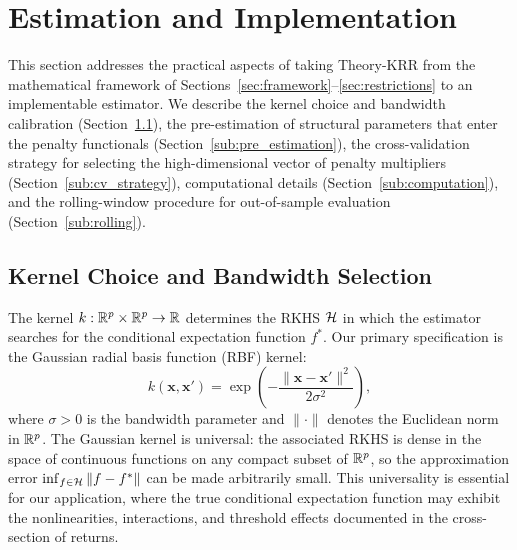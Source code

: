 
\section{Estimation and Implementation}\label{sec:estimation}

This section addresses the practical aspects of taking Theory-KRR from the mathematical framework of Sections~\ref{sec:framework}--\ref{sec:restrictions} to an implementable estimator.
We describe the kernel choice and bandwidth calibration (Section~\ref{sub:kernel_choice}), the pre-estimation of structural parameters that enter the penalty functionals (Section~\ref{sub:pre_estimation}), the cross-validation strategy for selecting the high-dimensional vector of penalty multipliers (Section~\ref{sub:cv_strategy}), computational details (Section~\ref{sub:computation}), and the rolling-window procedure for out-of-sample evaluation (Section~\ref{sub:rolling}).

\subsection{Kernel Choice and Bandwidth Selection}\label{sub:kernel_choice}

The kernel $k: \mathbb{R}^p \times \mathbb{R}^p \to \mathbb{R}$ determines the RKHS $\mathcal{H}$ in which the estimator searches for the conditional expectation function $f^*$.
Our primary specification is the Gaussian radial basis function (RBF) kernel:
\begin{equation}\label{eq:gaussian_kernel}
k(\mathbf{x}, \mathbf{x}') = \exp\!\left(-\frac{\|\mathbf{x} - \mathbf{x}'\|^2}{2\sigma^2}\right),
\end{equation}
where $\sigma > 0$ is the bandwidth parameter and $\|\cdot\|$ denotes the Euclidean norm in $\mathbb{R}^p$.
The Gaussian kernel is universal: the associated RKHS is dense in the space of continuous functions on any compact subset of $\mathbb{R}^p$, so the approximation error $\inf_{f \in \mathcal{H}}\|f - f^*\|$ can be made arbitrarily small.
This universality is essential for our application, where the true conditional expectation function may exhibit the nonlinearities, interactions, and threshold effects documented in the cross-section of returns.

